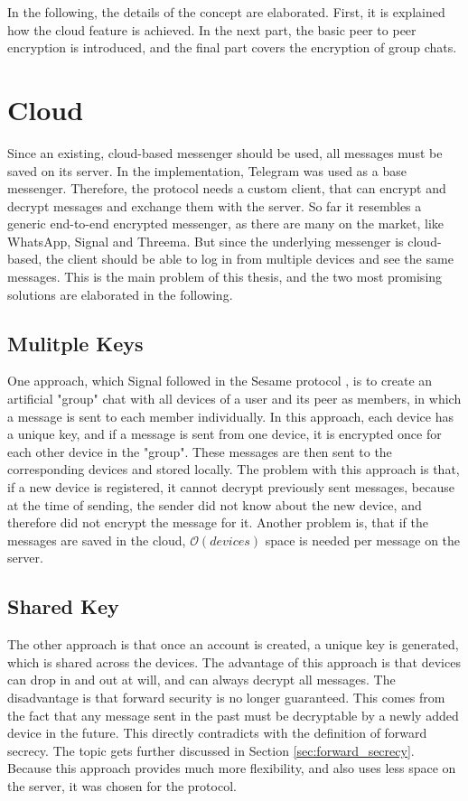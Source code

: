 \documentclass[a4paper, oneside]{discothesis}
\begin{document}
In the following, the details of the concept are elaborated. First, it is explained how the cloud feature is achieved. In the next part, the basic peer to peer encryption is introduced, and the final part covers the encryption of group chats.

\section{Cloud}

Since an existing, cloud-based messenger should be used, all messages must be saved on its server. In the implementation, Telegram was used as a base messenger. Therefore, the protocol needs a custom client, that can encrypt and decrypt messages and exchange them with the server. So far it resembles a generic end-to-end encrypted messenger, as there are many on the market, like WhatsApp, Signal and Threema. But since the underlying messenger is cloud-based, the client should be able to log in from multiple devices and see the same messages. This is the main problem of this thesis, and the two most promising solutions are elaborated in the following.

\subsection{Mulitple Keys}

One approach, which Signal followed in the Sesame protocol \cite{Sesame}, is to create an artificial "group" chat with all devices of a user and its peer as members, in which a message is sent to each member individually. In this approach, each device has a unique key, and if a message is sent from one device, it is encrypted once for each other device in the "group". These messages are then sent to the corresponding devices and stored locally. The problem with this approach is that, if a new device is registered, it cannot decrypt previously sent messages, because at the time of sending, the sender did not know about the new device, and therefore did not encrypt the message for it. Another problem is, that if the messages are saved in the cloud, $\mathcal{O}(devices)$ space is needed per message on the server.

\subsection{Shared Key}

The other approach is that once an account is created, a unique key is generated, which is shared across the devices. The advantage of this approach is that devices can drop in and out at will, and can always decrypt all messages. The disadvantage is that forward security is no longer guaranteed. This comes from the fact that any message sent in the past must be decryptable by a newly added device in the future. This directly contradicts with the definition of forward secrecy. The topic gets further discussed in Section \ref{sec:forward_secrecy}. Because this approach provides much more flexibility, and also uses less space on the server, it was chosen for the protocol.
\end{document}
